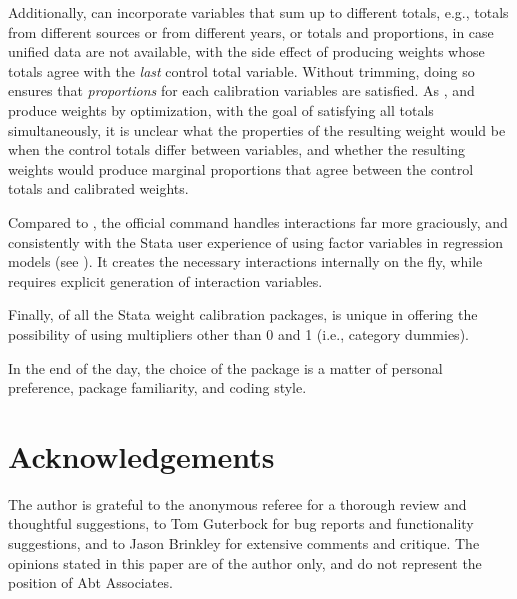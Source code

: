 Additionally,  can incorporate variables
that sum up to different totals, e.g., totals from different sources
or from different years, or totals and proportions, in case unified data
are not available, with the side effect of producing weights whose totals agree
with the \textit{last} control total variable. Without trimming, doing so ensures
that \textit{proportions} for each calibration variables are satisfied.
As ,
 and  produce weights by optimization,
with the goal of satisfying all totals simultaneously, it is unclear
what the properties of the resulting weight would be when the control totals
differ between variables, and whether the resulting weights would produce
marginal proportions that agree between the control totals and calibrated weights.

Compared to , the official  command handles
interactions far more graciously, and consistently with the Stata user experience
of using factor variables in regression models (see ). 
It creates the necessary interactions internally on the fly, 
while  requires explicit generation of interaction variables.

Finally, of all the Stata weight calibration packages,  is unique
in offering the possibility of using multipliers other than 0 and 1 (i.e., category dummies).

In the end of the day,
the choice of the package is a matter of personal preference, package familiarity,
and coding style.











\section*{Acknowledgements}

The author is grateful
to the anonymous referee for a thorough review and thoughtful suggestions,
to Tom Guterbock for bug reports and functionality suggestions,
and to Jason Brinkley for extensive comments and critique.
The opinions stated in this paper
are of the author only, and do not represent the position of Abt Associates.



% 

